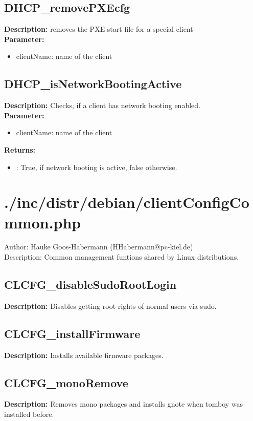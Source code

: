 \subsection{DHCP\_removePXEcfg}
\textbf{Description:} removes the PXE start file for a special client\\
\textbf{Parameter:}
\begin{itemize}
\item clientName: name of the client
\end{itemize}

\subsection{DHCP\_isNetworkBootingActive}
\textbf{Description:} Checks, if a client has network booting enabled.\\
\textbf{Parameter:}
\begin{itemize}
\item clientName: name of the client
\end{itemize}
\textbf{Returns:}
\begin{itemize}
\item : True, if network booting is active, false otherwise.
\end{itemize}

\newpage\section{./inc/distr/debian/clientConfigCommon.php}
 Author: Hauke Goos-Habermann (HHabermann@pc-kiel.de)\\
 Description: Common management funtions shared by Linux distributions.\\

\subsection{CLCFG\_disableSudoRootLogin}
\textbf{Description:} Disables getting root rights of normal users via sudo.\\

\subsection{CLCFG\_installFirmware}
\textbf{Description:} Installs available firmware packages.\\

\subsection{CLCFG\_monoRemove}
\textbf{Description:} Removes mono packages and installs gnote when tomboy was installed before.\\

